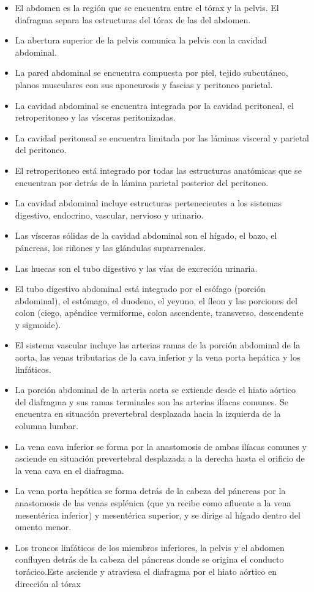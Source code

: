 \begin{itemize}
	\item El abdomen es la región que se encuentra entre el tórax y la pelvis. El diafragma separa las estructuras del tórax de las del abdomen. 
	\item La abertura superior de la pelvis comunica la pelvis con la cavidad abdominal.
	\item La pared abdominal se encuentra compuesta por piel, tejido subcutáneo, planos musculares con sus aponeurosis y fascias y peritoneo parietal.
	\item La cavidad abdominal se encuentra integrada por la cavidad peritoneal, el retroperitoneo y las vísceras peritonizadas.
	\item La cavidad peritoneal se encuentra limitada por las láminas visceral y parietal del peritoneo.
	\item El retroperitoneo está integrado por todas las estructuras anatómicas que se encuentran por detrás de la lámina parietal posterior del peritoneo.
	\item La cavidad abdominal incluye estructuras pertenecientes a los sistemas digestivo, endocrino, vascular, nervioso y urinario.
	\item Las vísceras sólidas de la cavidad abdominal son el hígado, el bazo, el páncreas, los riñones y las glándulas suprarrenales.
	\item Las huecas son el tubo digestivo y las vías de excreción urinaria. 
	\item El tubo digestivo abdominal está integrado por el esófago (porción abdominal), el estómago, el duodeno, el yeyuno, el íleon y las porciones del colon (ciego, apéndice vermiforme, colon ascendente, transverso, descendente y sigmoide).
	\item El sistema vascular incluye las arterias ramas de la porción abdominal de la aorta, las venas tributarias de la cava inferior y la vena porta hepática y los linfáticos.
	\item La porción abdominal de la arteria aorta se extiende desde el hiato aórtico del diafragma y sus ramas terminales son las arterias ilíacas comunes. Se encuentra en situación prevertebral desplazada hacia la izquierda de la columna lumbar. 
	\item La vena cava inferior se forma por la anastomosis de ambas ilíacas comunes y asciende en situación prevertebral desplazada a la derecha hasta el orificio de la vena cava en el diafragma.
	\item La vena porta hepática se forma detrás de la cabeza del páncreas por la anastomosis de las venas esplénica (que ya recibe como afluente a la vena mesentérica inferior) y mesentérica superior, y se dirige al hígado dentro del omento menor.
	\item Los troncos linfáticos de los miembros inferiores, la pelvis y el abdomen confluyen detrás de la cabeza del páncreas donde se origina el conducto torácico.Este asciende y atraviesa el diafragma por el hiato aórtico en dirección al tórax
\end{itemize}

